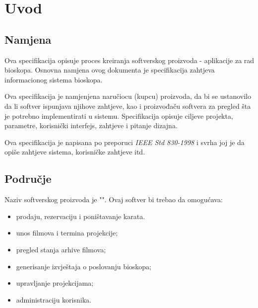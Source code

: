 \chapter{Uvod}
\section{Namjena}

Ova specifikacija opisuje proces kreiranja softverskog proizvoda - aplikacije za rad bioskopa. Osnovna namjena ovog dokumenta je specifikacija zahtjeva informacionog sistema bioskopa.

Ova specifikacija je namjenjena naručiocu (kupcu) proizvoda, da bi se ustanovilo da li softver ispunjava njihove zahtjeve, kao i proizvođaču softvera za pregled šta je potrebno implementirati u sistemu. Specifikacija opisuje ciljeve projekta, parametre, korisnički interfejs, zahtjeve i pitanje dizajna.


Ova specifikacija je napisana po preporuci \textit{IEEE Std 830-1998} i svrha joj je da opiše zahtjeve sistema, korisničke zahtjeve itd.

\section{Područje}

Naziv softverskog proizvoda je "\naziv". Ovaj softver bi trebao da omogućava:
\begin{itemize}
  \item prodaju, rezervaciju i poništavanje karata.
  \item unos filmova i termina projekcije;
  \item pregled stanja arhive filmova;
  \item generisanje izvještaja o poslovanju bioskopa;
  \item upravljanje projekcijama;
  \item administraciju korisnika.
\end{itemize}

